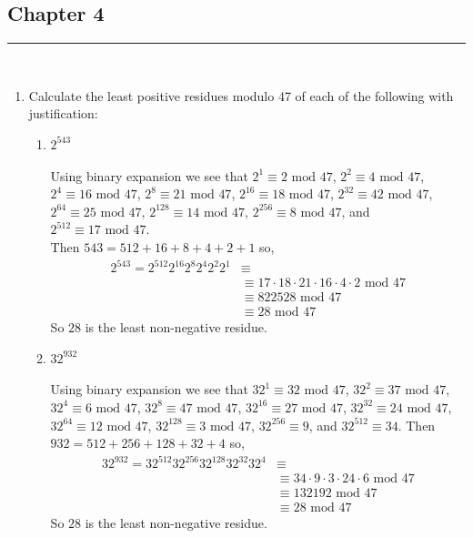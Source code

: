 \documentclass[class=article, crop=false]{standalone}
\begin{document}
\setcounter{subsection}{3}
\subsection{Chapter 4}
\rule{\textwidth}{1pt}\\
\begin{enumerate}
\item
  Calculate the least positive residues modulo 47 of each of
  the following with justification:
  \begin{enumerate}
  \item $2^{543}$ \\\\
  Using binary expansion we see that $2^1 \equiv 2\mbox{ mod } 47$, $2^2 \equiv 4\mbox{ mod } 47$,
  $2^4 \equiv 16\mbox{ mod } 47$, $2^8 \equiv 21\mbox{ mod } 47$, $2^{16} \equiv 18\mbox{ mod } 47$, $2^{32} \equiv 42\mbox{ mod } 47$,
  $2^{64}\equiv 25\mbox{ mod } 47$, $2^{128}\equiv 14\mbox{ mod } 47$, $2^{256}\equiv 8\mbox{ mod } 47$, and $2^{512}\equiv 17\mbox{ mod } 47$.\\
  Then $543 = 512 + 16 + 8 + 4 + 2 + 1$ so,
  \begin{align*}
	2^{543} = 2^{512}2^{16}2^{8}2^{4}2^{2}2^{1} &\equiv \\
	&\equiv 17\cdot18\cdot 21\cdot 16\cdot 4\cdot 2 \mbox{ mod } 47 \\
	&\equiv 822528 \mbox{ mod } 47 \\
	&\equiv 28 \mbox{ mod } 47
  \end{align*}
  So $28$ is the least non-negative residue.
  
  \item $32^{932}$ \\\\
  Using binary expansion we see that $32^1 \equiv 32\mbox{ mod }47$,
  $32^2 \equiv 37\mbox{ mod }47$, $32^4\equiv 6\mbox{ mod }47$, $32^8\equiv 47\mbox{ mod }47$,
  $32^{16}\equiv 27\mbox{ mod }47$, $32^{32}\equiv 24\mbox{ mod }47$, $32^{64}\equiv 12\mbox{ mod }47$,
  $32^{128}\equiv 3\mbox{ mod }47$, $32^{256}\equiv 9$, and $32^{512}\equiv 34$.
  Then $932 = 512 + 256 + 128 + 32 + 4$ so,
  \begin{align*}
	32^{932} = 32^{512}32^{256}32^{128}32^{32}32^4 &\equiv \\
	&\equiv 34\cdot 9\cdot 3\cdot 24\cdot 6 \mbox{ mod }47 \\
	&\equiv 132192 \mbox{ mod }47 \\
	&\equiv 28 \mbox{ mod }47
  \end{align*}
  So $28$ is the least non-negative residue.
  

\end{enumerate}
\end{enumerate}
\end{document}
